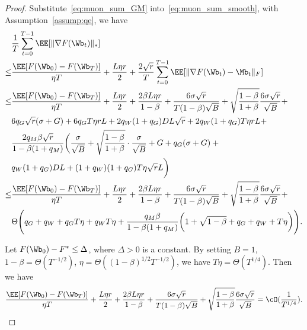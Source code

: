 \documentclass[11pt, letterpaper]{article}
\begin{document}
\begin{proof}
Substitute~\eqref{eq:muon_sum_GM} into~\eqref{eq:muon_sum_smooth}, with Assumption~\ref{assump:qe}, we have
\begin{align*}
    &\frac{1}{T}\sum_{t=0}^{T-1}\EE[\| \nabla F(\Wb_t) \|_*] \\
    \le& \frac{\EE[F(\Wb_0)-F(\Wb_T)]}{\eta T} + \frac{L\eta r}{2}+\frac{2\sqrt{r}}{T}\sum_{t=0}^{T-1}\EE[\|\nabla F(\Wb_t) - \Mb_t\|_F] \\
    \le& \frac{\EE[F(\Wb_0)-F(\Wb_T)]}{\eta T} + \frac{L\eta r}{2}+ \frac{2\beta L\eta r}{1-\beta} + \frac{6\sigma\sqrt{r}}{T(1-\beta)\sqrt{B}}+\sqrt{\frac{1-\beta}{1+\beta}}\frac{6\sigma\sqrt{r}}{\sqrt{B}} +\notag \\
    & 6q_G\sqrt{r}(\sigma + G) + 6q_G T\eta r L + 2q_W(1+q_G)DL\sqrt{r} + 2q_W(1+q_G)T\eta r L + \notag \\
    & \frac{2q_M\beta\sqrt{r}}{1-\beta(1+q_M)}\bigg( \frac{\sigma}{\sqrt{B}} + \sqrt{\frac{1-\beta}{1+\beta}}\cdot\frac{\sigma}{\sqrt{B}} + G + q_G(\sigma + G) + \notag \bigg.\\
    &\bigg. q_W (1+q_G)DL + (1+q_W)(1+q_G)T\eta \sqrt{r} L \bigg) \\
    \le& \frac{\EE[F(\Wb_0)-F(\Wb_T)]}{\eta T} + \frac{L\eta r}{2}+ \frac{2\beta L\eta r}{1-\beta} + \frac{6\sigma\sqrt{r}}{T(1-\beta)\sqrt{B}}+ \sqrt{\frac{1-\beta}{1+\beta}}\frac{6\sigma\sqrt{r}}{\sqrt{B}} + \\ 
    &\Theta\Bigg(q_G+ q_W + q_G T\eta + q_W T\eta + \frac{q_M\beta}{1-\beta(1+q_M)}\bigg(1+\sqrt{1-\beta} + q_G + q_W + T\eta\bigg) \Bigg).
\end{align*}



Let $F(\Wb_0) - F^* \le \Delta$, where $\Delta > 0$ is a constant. By setting $B=1$, $1-\beta = \Theta(T^{-1/2})$, $\eta = \Theta((1-\beta)^{1/2}T^{-1/2})$, we have $T\eta = \Theta(T^{1/4})$. Then we have
\begin{align*}
    \frac{\EE[F(\Wb_0)-F(\Wb_T)]}{\eta T} + \frac{L\eta r}{2}+ \frac{2\beta L\eta r}{1-\beta} + \frac{6\sigma\sqrt{r}}{T(1-\beta)\sqrt{B}}+\sqrt{\frac{1-\beta}{1+\beta}}\frac{6\sigma\sqrt{r}}{\sqrt{B}} = \cO(\frac{1}{T^{1/4}}).
\end{align*}


\end{proof}
\end{document}
